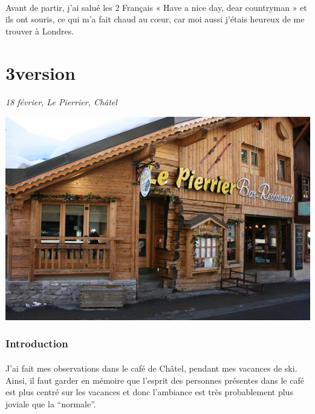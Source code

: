 \paragraph{} Avant de partir, j'ai salué les 2 Français « Have a nice day, dear
countryman » et ils ont souris, ce qui m'a fait chaud au cœur, car moi aussi
j'étais heureux de me trouver à Londres.

\section{3\ieme version}

\paragraph{}
\emph{18 février, Le Pierrier, Châtel}

\begin{center}
	\includegraphics[scale=0.5]{pierrier.jpg}
\end{center}

\subsubsection{Introduction}

\paragraph{} J'ai fait mes observations dans le café de Châtel, pendant mes
vacances de ski.  Ainsi, il faut garder en mémoire que l'esprit des personnes
présentes dans le café est plus centré sur les vacances et donc l'ambiance est
très probablement plus joviale que la ``normale''.

